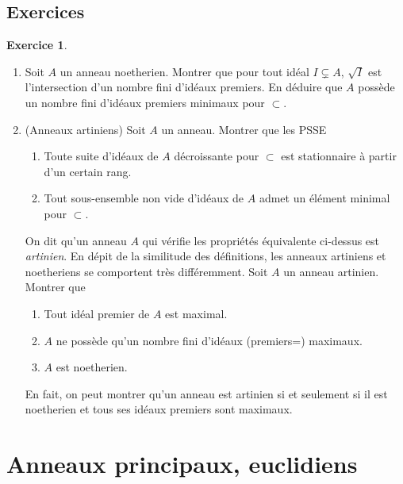 \documentclass[a4paper, oneside, 12pt]{book}
\theoremstyle{theoremeStyle} %
\theoremstyle{definition} %
\newtheorem{exercice}[theoreme]{Exercice}
\begin{document}
\section{Exercices}

\begin{exercice}\label{NoethExercices}
  \begin{enumerate}[leftmargin=* ,parsep=0cm,itemsep=0cm,topsep=0cm]
  \item Soit $A$ un anneau noetherien. Montrer que pour tout idéal  $I\subsetneq A$, $\sqrt{I}$ est l'intersection d'un nombre fini d'idéaux premiers. En déduire que $A$ possède un nombre fini d'idéaux premiers minimaux pour $\subset$. \\
  \item (Anneaux artiniens) Soit $A$ un anneau. Montrer que les PSSE\\
    \begin{enumerate} 
    \item Toute suite d'idéaux de $A$ décroissante pour $\subset$ est stationnaire à partir d'un certain rang.
    \item Tout sous-ensemble non vide d'idéaux de $A$ admet un élément minimal pour $\subset $.\\
    \end{enumerate}
    On dit qu'un anneau $A$ qui vérifie les propriétés équivalente ci-dessus est \textit{artinien}. En dépit de la similitude des définitions, les anneaux artiniens et noetheriens se comportent très différemment. Soit $A$ un anneau artinien. Montrer que\\
    \begin{enumerate} 
    \item  Tout idéal premier de $A $ est maximal.
    \item  $A$ ne possède qu'un nombre fini d'idéaux (premiers=) maximaux.
    \item  $A$ est noetherien.\\
    \end{enumerate}
    En fait, on peut montrer qu'un anneau est artinien si et seulement si il est noetherien et tous ses idéaux premiers sont maximaux.
  \end{enumerate}
\end{exercice}



\chapter{Anneaux principaux, euclidiens } 
\end{document}
